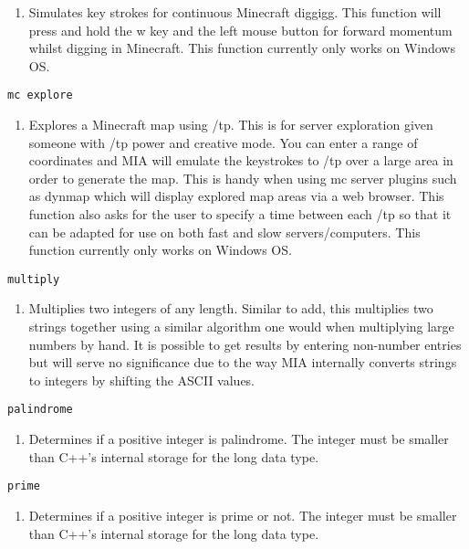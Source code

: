 \begin{enumerate}
	\item[] Simulates key strokes for continuous Minecraft diggigg. This function will press and hold the w key and the left mouse button for forward momentum whilst digging in Minecraft. This function currently only works on Windows OS.
\end{enumerate}
\begin{lstlisting} 
mc explore
\end{lstlisting}
\begin{enumerate}
\item[]  Explores a Minecraft map using /tp. This is for server exploration given someone with /tp power and creative mode. You can enter a range of coordinates and MIA will emulate the keystrokes to /tp over a large area in order to generate the map. This is handy when using mc server plugins such as dynmap which will display explored map areas via a web browser. This function also asks for the user to specify a time between each /tp so that it can be adapted for use on both fast and slow servers/computers. This function currently only works on Windows OS.
\end{enumerate}
\begin{lstlisting} 
multiply  
\end{lstlisting}
\begin{enumerate}
	\item[] Multiplies two integers of any length. Similar to add, this multiplies two strings together using a similar algorithm one would when multiplying large numbers by hand. It is possible to get results by entering non-number entries but will serve no significance due to the way MIA internally converts strings to integers by shifting the ASCII values.
\end{enumerate}
\begin{lstlisting} 
palindrome   
\end{lstlisting}
\begin{enumerate}
	\item[] Determines if a positive integer is palindrome. The integer must be smaller than C++'s internal storage for the long data type.
\end{enumerate}
\begin{lstlisting} 
prime   
\end{lstlisting}
\begin{enumerate}
	\item[] Determines if a positive integer is prime or not. The integer must be smaller than C++'s internal storage for the long data type.
\end{enumerate}
